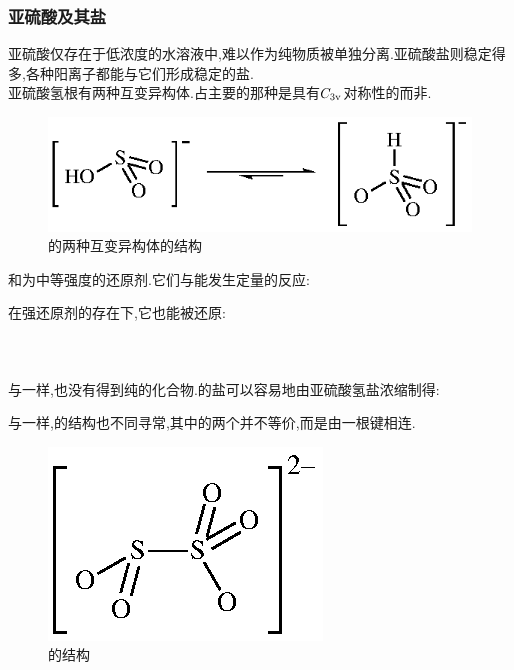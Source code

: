 \documentclass{ctexart}
\begin{document}
\subsubsection{亚硫酸及其盐}
亚硫酸仅存在于低浓度的水溶液中,难以作为纯物质被单独分离.亚硫酸盐则稳定得多,各种阳离子都能与它们形成稳定的盐.\\
\indent 亚硫酸氢根有两种互变异构体.占主要的那种是具有$C_{3\text v}$对称性的而非.
\begin{figure}[H]
    \centering\includegraphics{picture/HSO3-.eps}
    \caption{的两种互变异构体的结构}
\end{figure}
\indent {}和为中等强度的还原剂.它们与能发生定量的反应:
\begin{center}
\end{center}
在强还原剂的存在下,它也能被还原:
\begin{center}
    \\
\end{center}
\subsubsection{}
与一样,也没有得到纯的化合物.的盐可以容易地由亚硫酸氢盐浓缩制得:
\begin{center}
\end{center}
与一样,的结构也不同寻常,其中的两个并不等价,而是由一根键相连.
\begin{figure}[H]
    \centering\includegraphics{picture/S2O52-.eps}
    \caption{的结构}
\end{figure}
\end{document}
